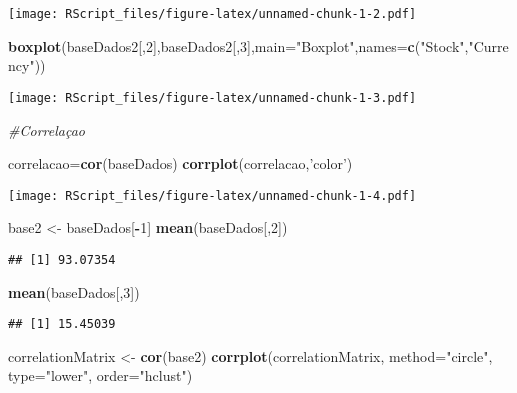 \documentclass[]{article}
\newenvironment{Shaded}{\begin{snugshade}}{\end{snugshade}}
\newcommand{\KeywordTok}[1]{\textcolor[rgb]{0.13,0.29,0.53}{\textbf{#1}}}
\newcommand{\DataTypeTok}[1]{\textcolor[rgb]{0.13,0.29,0.53}{#1}}
\newcommand{\DecValTok}[1]{\textcolor[rgb]{0.00,0.00,0.81}{#1}}
\newcommand{\StringTok}[1]{\textcolor[rgb]{0.31,0.60,0.02}{#1}}
\newcommand{\CommentTok}[1]{\textcolor[rgb]{0.56,0.35,0.01}{\textit{#1}}}
\newcommand{\OperatorTok}[1]{\textcolor[rgb]{0.81,0.36,0.00}{\textbf{#1}}}
\newcommand{\NormalTok}[1]{#1}
\begin{document}
\texttt{[image: RScript\_files/figure-latex/unnamed-chunk-1-2.pdf]}

\begin{Shaded}
\begin{Highlighting}[]
\KeywordTok{boxplot}\NormalTok{(baseDados2[,}\DecValTok{2}\NormalTok{],baseDados2[,}\DecValTok{3}\NormalTok{],}\DataTypeTok{main=}\StringTok{"Boxplot"}\NormalTok{,}\DataTypeTok{names=}\KeywordTok{c}\NormalTok{(}\StringTok{"Stock"}\NormalTok{,}\StringTok{"Currency"}\NormalTok{))}
\end{Highlighting}
\end{Shaded}

\texttt{[image: RScript\_files/figure-latex/unnamed-chunk-1-3.pdf]}

\begin{Shaded}
\begin{Highlighting}[]
\CommentTok{#Correlaçao}

\NormalTok{correlacao=}\KeywordTok{cor}\NormalTok{(baseDados)}
\KeywordTok{corrplot}\NormalTok{(correlacao,}\StringTok{'color'}\NormalTok{)}
\end{Highlighting}
\end{Shaded}

\texttt{[image: RScript\_files/figure-latex/unnamed-chunk-1-4.pdf]}

\begin{Shaded}
\begin{Highlighting}[]
\NormalTok{base2 <-}\StringTok{ }\NormalTok{baseDados[}\OperatorTok{-}\DecValTok{1}\NormalTok{]}
\KeywordTok{mean}\NormalTok{(baseDados[,}\DecValTok{2}\NormalTok{])}
\end{Highlighting}
\end{Shaded}

\begin{verbatim}
## [1] 93.07354
\end{verbatim}

\begin{Shaded}
\begin{Highlighting}[]
\KeywordTok{mean}\NormalTok{(baseDados[,}\DecValTok{3}\NormalTok{])}
\end{Highlighting}
\end{Shaded}

\begin{verbatim}
## [1] 15.45039
\end{verbatim}

\begin{Shaded}
\begin{Highlighting}[]
\NormalTok{correlationMatrix <-}\StringTok{ }\KeywordTok{cor}\NormalTok{(base2)}
\KeywordTok{corrplot}\NormalTok{(correlationMatrix, }\DataTypeTok{method=}\StringTok{"circle"}\NormalTok{, }\DataTypeTok{type=}\StringTok{"lower"}\NormalTok{, }\DataTypeTok{order=}\StringTok{"hclust"}\NormalTok{)}
\end{Highlighting}
\end{Shaded}
\end{document}
